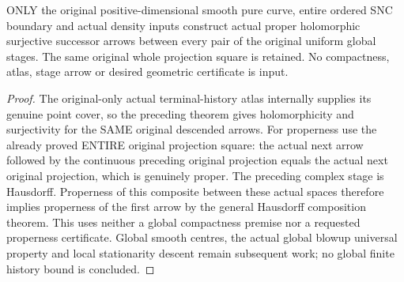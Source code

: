 \begin{theorem}
\label{hir:sharp-actual-curve-original-global-successor-geometry}
\leanok
ONLY the original positive-dimensional smooth pure curve, entire ordered
SNC boundary and actual density inputs construct actual proper holomorphic
surjective successor arrows between every pair of the original uniform
global stages. The same original whole projection square is retained.
No compactness, atlas, stage arrow or desired geometric certificate is input.
\end{theorem}
\begin{proof}
The original-only actual terminal-history atlas internally supplies its
genuine point cover, so the preceding theorem gives holomorphicity and
surjectivity for the SAME original descended arrows. For properness use
the already proved ENTIRE original projection square: the actual next
arrow followed by the continuous preceding original projection equals
the actual next original projection, which is genuinely proper. The
preceding complex stage is Hausdorff. Properness of this composite between
these actual spaces therefore implies properness of the first arrow by
the general Hausdorff composition theorem. This uses neither a global
compactness premise nor a requested properness certificate.
Global smooth centres, the actual global blowup universal property and
local stationarity descent remain subsequent work; no global finite
history bound is concluded.
\end{proof}
